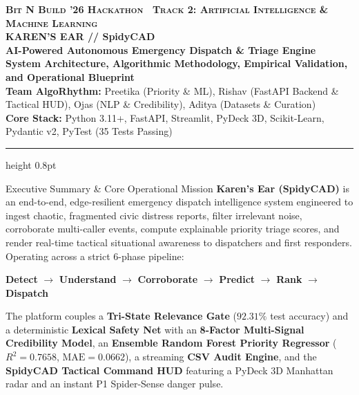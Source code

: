 \documentclass[10pt,a4paper]{article}
\begin{document}
\begin{center}
  {\small\scshape\bfseries\color{SlateBlue}Bit N Build '26 Hackathon \textbar\ Track 2: Artificial Intelligence \& Machine Learning}\\[0.12cm]
  {\LARGE\bfseries\color{DarkNavy} KAREN'S EAR // SpidyCAD}\\[0.06cm]
  {\large\bfseries\color{SlateBlue} AI-Powered Autonomous Emergency Dispatch \& Triage Engine}\\[0.10cm]
  {\small\color{AccentBlue}\textbf{System Architecture, Algorithmic Methodology, Empirical Validation, and Operational Blueprint}}\\[0.14cm]
  {\footnotesize \textbf{Team AlgoRhythm:} Preetika (Priority \& ML), Rishav (FastAPI Backend \& Tactical HUD), Ojas (NLP \& Credibility), Aditya (Datasets \& Curation)}\\
  {\footnotesize \textbf{Core Stack:} Python 3.11+, FastAPI, Streamlit, PyDeck 3D, Scikit-Learn, Pydantic v2, PyTest (35 Tests Passing)}
\end{center}
\vspace{-0.2cm}
\hrule height 0.8pt
\vspace{0.25cm}

\begin{calloutbox}{Executive Summary \& Core Operational Mission}
\small
\textbf{Karen's Ear (SpidyCAD)} is an end-to-end, edge-resilient emergency dispatch intelligence system engineered to ingest chaotic, fragmented civic distress reports, filter irrelevant noise, corroborate multi-caller events, compute explainable priority triage scores, and render real-time tactical situational awareness to dispatchers and first responders. Operating across a strict 6-phase pipeline:
\begin{center}
  \textbf{\color{DarkNavy} Detect} $\boldsymbol{\longrightarrow}$ 
  \textbf{\color{DarkNavy} Understand} $\boldsymbol{\longrightarrow}$ 
  \textbf{\color{DarkNavy} Corroborate} $\boldsymbol{\longrightarrow}$ 
  \textbf{\color{DarkNavy} Predict} $\boldsymbol{\longrightarrow}$ 
  \textbf{\color{DarkNavy} Rank} $\boldsymbol{\longrightarrow}$ 
  \textbf{\color{DarkNavy} Dispatch}
\end{center}
The platform couples a \textbf{Tri-State Relevance Gate} ($92.31\%$ test accuracy) and a deterministic \textbf{Lexical Safety Net} with an \textbf{8-Factor Multi-Signal Credibility Model}, an \textbf{Ensemble Random Forest Priority Regressor} ($R^2 = 0.7658$, $\text{MAE} = 0.0662$), a streaming \textbf{CSV Audit Engine}, and the \textbf{SpidyCAD Tactical Command HUD} featuring a PyDeck 3D Manhattan radar and an instant P1 Spider-Sense danger pulse.
\end{calloutbox}
\end{document}
